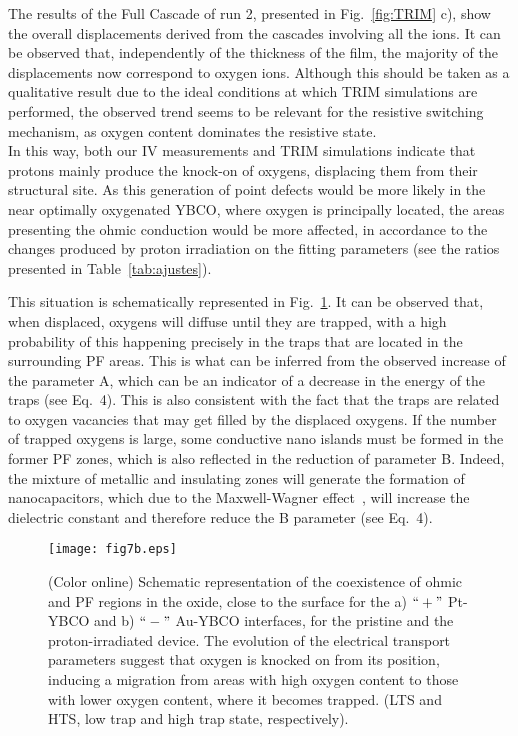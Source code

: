 \documentclass[square,aip,preprint,showkeys,superscriptaddress]{revtex4}
\begin{document}
The results of the Full Cascade of run 2, presented in Fig.~\ref{fig:TRIM} c), show the overall displacements derived from the cascades involving all the ions. It can be observed that, independently of the thickness of the film, the majority of the displacements now correspond to oxygen ions. Although this should be taken as a qualitative result due to the ideal conditions at which TRIM simulations are performed, the observed trend seems to be relevant for the resistive switching mechanism, as oxygen content dominates the resistive state. \\


In this way, both our IV measurements and TRIM simulations indicate that protons mainly produce the knock-on of oxygens, displacing them from their structural site. As this generation of point defects would be more likely in the near optimally oxygenated YBCO, where oxygen is principally located, the areas presenting the ohmic conduction would be more affected, in accordance to the changes produced by proton irradiation on the fitting parameters (see the ratios presented in Table~\ref{tab:ajustes}). 

This situation is schematically represented in Fig.~\ref{fig:schematic}. It can be observed that, when displaced, oxygens will diffuse until they are trapped, with a high probability of this happening precisely in the traps that are located in the surrounding PF areas. This is what can be inferred from the observed increase of the parameter A, which can be an indicator of a decrease in the energy of the traps (see Eq.~4). This is also consistent with the fact that the traps are related to oxygen vacancies that may get filled by the displaced oxygens. If the number of trapped oxygens is large, some conductive nano islands must be formed in the former PF zones, which is also reflected in the reduction of parameter B. Indeed, the mixture of metallic and insulating zones will generate the formation of nanocapacitors, which due to the Maxwell-Wagner effect~\cite{VonHippel62,Lunkenheimer10}, will increase the dielectric constant and therefore reduce the B parameter (see Eq.~4).  

\begin{figure} [t]
	\vspace{-10mm}
	\centerline{\texttt{[image: fig7b.eps]}}
	\vspace{-0mm}\caption{(Color online) Schematic representation of the coexistence of ohmic and PF regions in the oxide, close to the surface for the a)  $``+"$ Pt-YBCO and b) $``-"$ Au-YBCO interfaces, for the pristine and the proton-irradiated device. The evolution of the electrical transport parameters suggest that oxygen is knocked on from its position, inducing a migration from areas with high oxygen content to those with lower oxygen content, where it becomes trapped. (LTS and HTS, low trap and high trap state, respectively).} 
	\vspace{-0mm}
	\label{fig:schematic}
\end{figure}
\end{document}
